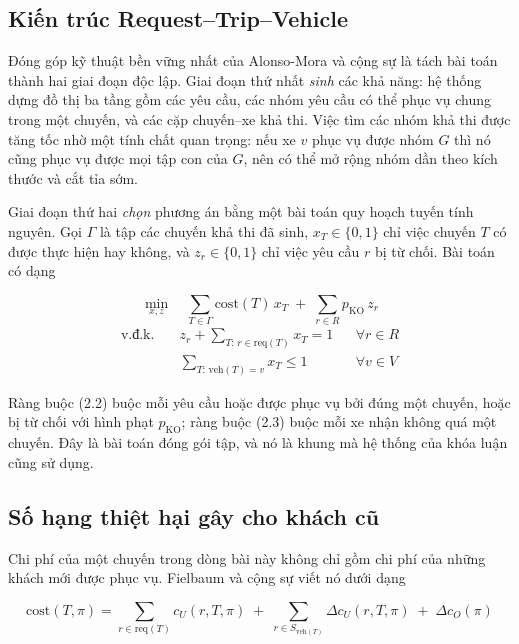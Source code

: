 \subsection{Kiến trúc Request--Trip--Vehicle}

Đóng góp kỹ thuật bền vững nhất của Alonso-Mora và cộng sự \cite{alonsomora2017} là tách bài
toán thành hai giai đoạn độc lập. Giai đoạn thứ nhất \emph{sinh} các khả năng: hệ thống dựng
đồ thị ba tầng gồm các yêu cầu, các nhóm yêu cầu có thể phục vụ chung trong một chuyến, và các
cặp chuyến--xe khả thi. Việc tìm các nhóm khả thi được tăng tốc nhờ một tính chất quan trọng:
nếu xe $v$ phục vụ được nhóm $G$ thì nó cũng phục vụ được mọi tập con của $G$, nên có thể mở
rộng nhóm dần theo kích thước và cắt tỉa sớm.

Giai đoạn thứ hai \emph{chọn} phương án bằng một bài toán quy hoạch tuyến tính nguyên. Gọi
$\Gamma$ là tập các chuyến khả thi đã sinh, $x_T \in \{0,1\}$ chỉ việc chuyến $T$ có được thực
hiện hay không, và $z_r \in \{0,1\}$ chỉ việc yêu cầu $r$ bị từ chối. Bài toán có dạng

\begin{equation}
\min_{x,z} \quad \sum_{T \in \Gamma} \mathrm{cost}(T)\, x_T \;+\; \sum_{r \in R} p_{\mathrm{KO}}\, z_r
\end{equation}
\begin{align}
\text{v.đ.k.}\quad & z_r + \sum_{T:\, r \in \mathrm{req}(T)} x_T = 1 && \forall r \in R\\
& \sum_{T:\, \mathrm{veh}(T)=v} x_T \le 1 && \forall v \in V
\end{align}

Ràng buộc (2.2) buộc mỗi yêu cầu hoặc được phục vụ bởi đúng một chuyến, hoặc bị từ chối với
hình phạt $p_{\mathrm{KO}}$; ràng buộc (2.3) buộc mỗi xe nhận không quá một chuyến. Đây là bài
toán đóng gói tập, và nó là khung mà hệ thống của khóa luận cũng sử dụng.

\subsection{Số hạng thiệt hại gây cho khách cũ}

Chi phí của một chuyến trong dòng bài này không chỉ gồm chi phí của những khách mới được phục
vụ. Fielbaum và cộng sự \cite{fielbaum2022scale} viết nó dưới dạng

\begin{equation}
\mathrm{cost}(T,\pi) = \sum_{r \in \mathrm{req}(T)} c_U(r,T,\pi)
\;+\; \sum_{r \in S_{\mathrm{veh}(T)}} \Delta c_U(r,T,\pi)
\;+\; \Delta c_O(\pi)
\end{equation}

